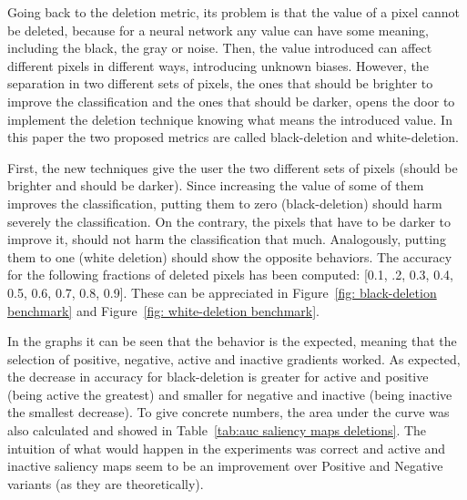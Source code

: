 \documentclass[preprint,12pt]{elsarticle}
\begin{document}
Going back to the deletion metric, its problem is that the value of a pixel cannot be deleted, because for a neural network any value can have some meaning, including the black, the gray or noise. Then, the value introduced can affect different pixels in different ways, introducing unknown biases. However, the separation in two different sets of pixels, the ones that should be brighter to improve the classification and the ones that should be darker, opens the door to implement the deletion technique knowing what means the introduced value. In this paper the two proposed metrics are called black-deletion and white-deletion.

First, the new techniques give the user the two different sets of pixels (should be brighter and should be darker). Since increasing the value of some of them improves the classification, putting them to zero (black-deletion) should harm severely the classification. On the contrary, the pixels that have to be darker to improve it, should not harm the classification that much. Analogously, putting them to one (white deletion) should show the opposite behaviors. The accuracy for the following fractions of deleted pixels has been computed: [0.1, .2, 0.3, 0.4, 0.5, 0.6, 0.7, 0.8, 0.9]. These can be appreciated in Figure~\ref{fig: black-deletion benchmark} and Figure~\ref{fig: white-deletion benchmark}. 

In the graphs it can be seen that the behavior is the expected, meaning that the selection of positive, negative, active and inactive gradients worked. As expected, the decrease in accuracy for black-deletion is greater for active and positive (being active the greatest) and smaller for negative and inactive (being inactive the smallest decrease). To give concrete numbers, the area under the curve was also calculated and showed in Table~\ref{tab:auc saliency maps deletions}. The intuition of what would happen in the experiments was correct and active and inactive saliency maps seem to be an improvement over Positive and Negative variants (as they are theoretically).
\end{document}
